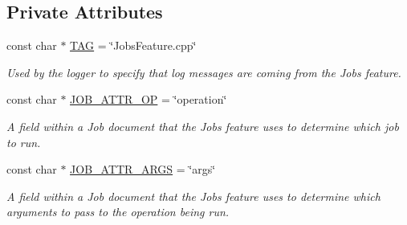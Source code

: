 \subsection*{Private Attributes}
\begin{DoxyCompactItemize}
\item 
\mbox{\label{class_aws_1_1_iot_1_1_device_client_1_1_jobs_1_1_jobs_feature_ac6fcbba9b37a075c82a8be74e0ef5941}} 
const char $\ast$ \hyperlink{class_aws_1_1_iot_1_1_device_client_1_1_jobs_1_1_jobs_feature_ac6fcbba9b37a075c82a8be74e0ef5941}{T\+AG} = \char`\"{}Jobs\+Feature.\+cpp\char`\"{}
\begin{DoxyCompactList}\small\item\em Used by the logger to specify that log messages are coming from the Jobs feature. \end{DoxyCompactList}\item 
\mbox{\label{class_aws_1_1_iot_1_1_device_client_1_1_jobs_1_1_jobs_feature_abc5ede80a369d78034b4a3b7e1700d09}} 
const char $\ast$ \hyperlink{class_aws_1_1_iot_1_1_device_client_1_1_jobs_1_1_jobs_feature_abc5ede80a369d78034b4a3b7e1700d09}{J\+O\+B\+\_\+\+A\+T\+T\+R\+\_\+\+OP} = \char`\"{}operation\char`\"{}
\begin{DoxyCompactList}\small\item\em A field within a Job document that the Jobs feature uses to determine which job to run. \end{DoxyCompactList}\item 
\mbox{\label{class_aws_1_1_iot_1_1_device_client_1_1_jobs_1_1_jobs_feature_ab4c8f275b27255bea9f67c2301ec1dfd}} 
const char $\ast$ \hyperlink{class_aws_1_1_iot_1_1_device_client_1_1_jobs_1_1_jobs_feature_ab4c8f275b27255bea9f67c2301ec1dfd}{J\+O\+B\+\_\+\+A\+T\+T\+R\+\_\+\+A\+R\+GS} = \char`\"{}args\char`\"{}
\begin{DoxyCompactList}\small\item\em A field within a Job document that the Jobs feature uses to determine which arguments to pass to the operation being run. \end{DoxyCompactList}\item 
\mbox{\label{class_aws_1_1_iot_1_1_device_client_1_1_jobs_1_1_jobs_feature_afd50429795fa66c3986132ca98f3d209}} 

\end{DoxyCompactItemize}
